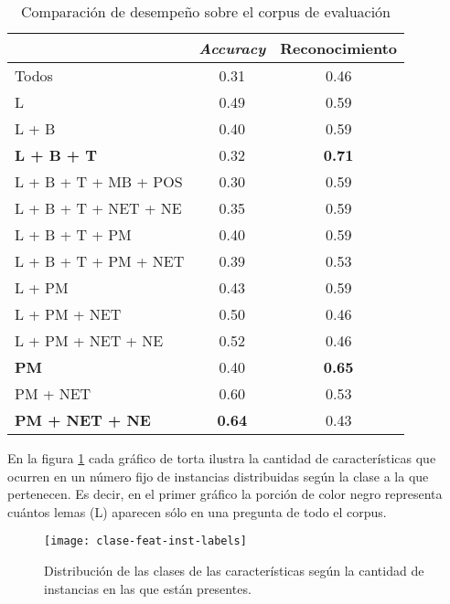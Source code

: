 \begin{table}[h!]\label{tabla-exp3}
\centering
\begin{tabular}{l c c}
     & \textit{Accuracy} & Reconocimiento \\ [0.5ex]
    \hline
    Todos & 0.31 & 0.46 \\[0.5ex]
    L & 0.49 & 0.59 \\ [0.5ex]
    L + B & 0.40 & 0.59 \\ [0.5ex]
    \textbf{L + B + T} & 0.32 & \textbf{0.71} \\[0.5ex]
    L + B + T + MB + POS & 0.30 & 0.59 \\[0.5ex]
    L + B + T + NET + NE & 0.35 & 0.59 \\[0.5ex]
    L + B + T + PM & 0.40 & 0.59 \\[0.5ex]
    L + B + T + PM + NET & 0.39 & 0.53 \\[0.5ex]
    L + PM & 0.43 & 0.59 \\[0.5ex]
    L + PM + NET & 0.50 & 0.46 \\[0.5ex]
    L + PM + NET + NE & 0.52 & 0.46 \\[0.5ex]
    \textbf{PM} & 0.40 & \textbf{0.65} \\[0.5ex]
    PM + NET & 0.60 & 0.53 \\[0.5ex]
    \textbf{PM + NET + NE} & \textbf{0.64} & 0.43 \\[0.5ex]
    \hline
\end{tabular}
\caption{Comparación de desempeño sobre el corpus de evaluación}
\end{table}

En la figura \ref{fig-distribucion-features} cada gráfico de torta ilustra la cantidad de características que ocurren en un número fijo de instancias distribuidas según la clase a la que pertenecen. Es decir, en el primer gráfico la porción de color negro representa cuántos lemas (L) aparecen sólo en una pregunta de todo el corpus.

\begin{figure}[h!]\label{fig-distribucion-features}
\centering
\texttt{[image: clase-feat-inst-labels]}
\caption{Distribución de las clases de las características según la cantidad de instancias en las que están presentes.}
\end{figure}

\vspace{3 mm}

